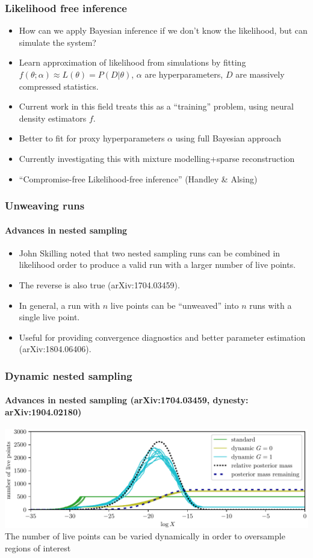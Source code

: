 \documentclass[%
]{beamer}
\begin{document}
\begin{frame}
    \frametitle{Likelihood free inference}
    \begin{itemize}
        \item How can we apply Bayesian inference if we don't know the likelihood, but can simulate the system?
        \item Learn approximation of likelihood from simulations by fitting $f(\theta;\alpha)\approx L(\theta) =P(D|\theta)$, $\alpha$ are hyperparameters, $D$ are massively compressed statistics.
        \item Current work in this field treats this as a ``training'' problem, using neural density estimators $f$.
        \item Better to fit for proxy hyperparameters $\alpha$ using full Bayesian approach 
        \item Currently investigating this with mixture modelling+sparse reconstruction
        \item ``Compromise-free Likelihood-free inference'' (Handley \& Alsing)
    \end{itemize}
\end{frame}

\begin{frame}
    \frametitle{Unweaving runs}
    \framesubtitle{Advances in nested sampling}
    \begin{itemize}
        \item John Skilling noted that two nested sampling runs can be combined in likelihood order to produce a valid run with a larger number of live points.
        \item The reverse is also true (arXiv:1704.03459).
        \item In general, a run with $n$ live points can be ``unweaved'' into $n$ runs with a single live point.
        \item Useful for providing convergence diagnostics and better parameter estimation (arXiv:1804.06406).
    \end{itemize}
\end{frame}


\begin{frame}
  \frametitle{Dynamic nested sampling}
  \framesubtitle{Advances in nested sampling (arXiv:1704.03459,  dynesty: arXiv:1904.02180)}
  \includegraphics[width=\textwidth]{figures/dynesty.pdf}
  The number of live points can be varied dynamically in order to oversample regions of interest
\end{frame}
\end{document}
